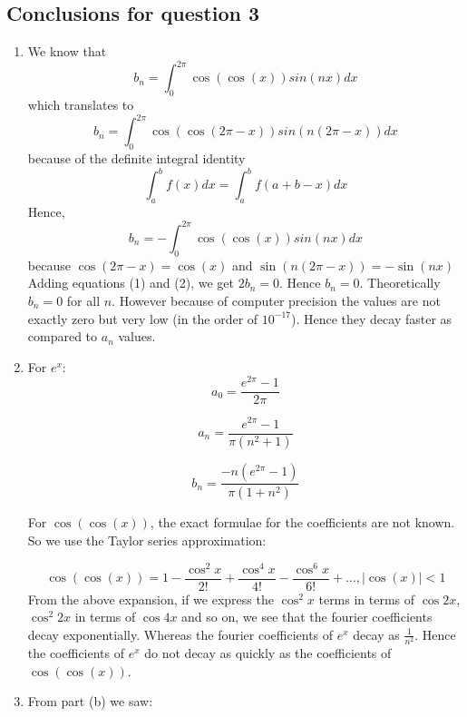 \documentclass[12pt, a4paper]{article}
\begin{document}
\subsection{Conclusions for question 3}
\begin{enumerate}[label=\alph*.]
    \item We know that
\begin{equation}
    b_{n} = \int_{0}^{2\pi} \cos(\cos(x))sin(nx)dx
\end{equation}
which translates to
\begin{equation*}
    b_{n} = \int_{0}^{2\pi} \cos(\cos(2\pi-x))sin(n(2\pi-x))dx
\end{equation*}
because of the definite integral identity
    \begin{equation*}
        \int_{a}^{b} f(x)dx = \int_{a}^{b} f(a+b-x)dx
    \end{equation*}
Hence, 
\begin{equation}
    b_{n} = -\int_{0}^{2\pi} \cos(\cos(x))sin(nx)dx
\end{equation}
because $\cos(2\pi-x) = \cos(x)$ and $\sin(n(2\pi-x)) = -\sin(nx)$\\
Adding equations (1) and (2), we get $2b_{n} = 0$. Hence $b_{n} = 0$.
Theoretically $b_{n} = 0$ for all $n$. However because of computer precision the values are not exactly zero but very low (in the order of $10^{-17}$). Hence they decay faster as compared to $a_{n}$ values.
\clearpage
    \item For $e^{x}$:
    \begin{equation*}
        a_{0} = \frac{e^{2\pi}-1}{2\pi}
    \end{equation*}

    \begin{equation*}
        a_{n} = \frac{e^{2\pi}-1}{\pi(n^{2}+1)}
    \end{equation*}

    \begin{equation*}
        b_n = \frac{-n(e^{2\pi}-1)}{\pi(1+n^{2})}
    \end{equation*}

    For $\cos(\cos(x))$, the exact formulae for the coefficients are not known. So we use the Taylor series approximation:

    \begin{equation*}
        \cos(\cos(x)) = 1 - \frac{\cos^{2}x}{2!} + \frac{\cos^{4}x}{4!} - \frac{\cos^{6}x}{6!} + \ldots ,   |\cos(x)|<1
    \end{equation*}
From the above expansion, if we express the $\cos^{2}x$ terms in terms of $\cos2x$, $\cos^{2}2x$ in terms of $\cos4x$ and so on, we see that the fourier coefficients decay exponentially.
Whereas the fourier coefficients of $e^{x}$ decay as $\frac{1}{n^{2}}$. Hence the coefficients of $e^{x}$ do not decay as quickly as the coefficients of $\cos(\cos(x))$.
    \item From part (b) we saw: 
    

\end{enumerate}
\end{document}
